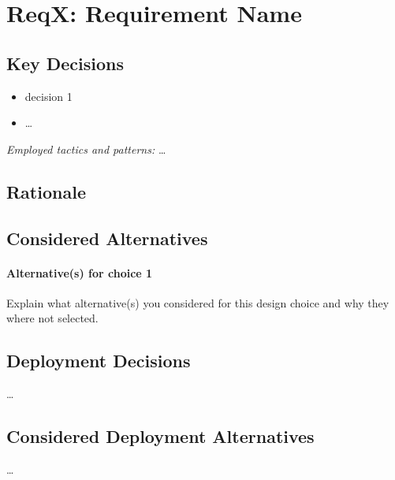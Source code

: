 
\showdecisionsnotes{}

\section{ReqX: Requirement Name}
    \subsection*{Key Decisions}
    \begin{itemize}
    	\item decision 1
    	\item \ldots
    \end{itemize}
    \emph{Employed tactics and patterns:} \ldots

    \subsection*{Rationale}

    \subsection*{Considered Alternatives}
    \paragraph{Alternative(s) for choice 1} Explain what alternative(s) you
    considered for this design choice and why they where not selected.

    \subsection*{Deployment Decisions}
    \ldots

    \subsection*{Considered Deployment Alternatives}
    \ldots

